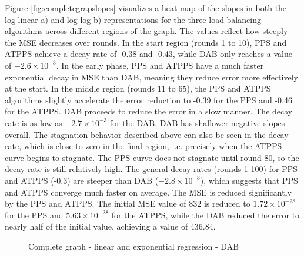 Figure \ref{fig:completegrapslopes} visualizes a heat map of the slopes in both the log-linear a) and log-log b) representations for the three load balancing algorithms across different regions of the graph. The values reflect how steeply the MSE decreases over rounds. In the start region (rounds 1 to 10), PPS and ATPPS achieve a decay rate of -0.38 and -0.43, while DAB only reaches a value of $-2.6 \times 10^{-3}$. In the early phase, PPS and ATPPS have a much faster exponential decay in MSE than DAB, meaning they reduce error more effectively at the start. In the middle region (rounds 11 to 65), the PPS and ATPPS algorithms slightly accelerate the error reduction to -0.39 for the PPS and -0.46 for the ATPPS. DAB proceeds to reduce the error in a slow manner. The decay rate is as low as $-2.7 \times 10^{-3}$ for the DAB. DAB has shallower negative slopes overall. The stagnation behavior described above can also be seen in the decay rate, which is close to zero in the final region, i.e. precisely when the ATPPS curve begins to stagnate. The PPS curve does not stagnate until round 80, so the decay rate is still relatively high. The general decay rates (rounds 1-100) for PPS and ATPPS (-0.3) are steeper than DAB ($-2.8 \times 10^{-3}$), which suggests that PPS and ATPPS converge much faster on average. The MSE is reduced significantly by the PPS and ATPPS. The initial MSE value of $832$ is reduced to $1.72 \times 10^{-28}$ for the PPS and $5.63 \times 10^{-28}$ for the ATPPS, while the DAB reduced the error to nearly half of the initial value, achieving a value of $436.84$.

\begin{figure}[!ht]
    \centering
    \hfil
    \caption{Complete graph - linear and exponential regression - DAB}
        \label{fig:dabCompleteModelFit}
\end{figure}


